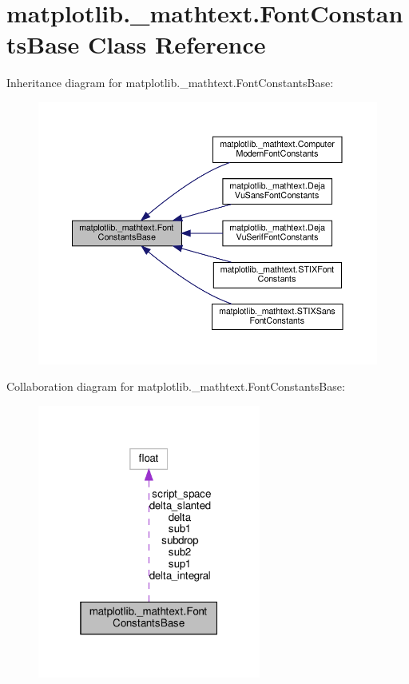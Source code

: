 \hypertarget{classmatplotlib_1_1__mathtext_1_1FontConstantsBase}{}\section{matplotlib.\+\_\+mathtext.\+Font\+Constants\+Base Class Reference}
\label{classmatplotlib_1_1__mathtext_1_1FontConstantsBase}


Inheritance diagram for matplotlib.\+\_\+mathtext.\+Font\+Constants\+Base\+:
\nopagebreak
\begin{figure}[H]
\begin{center}
\leavevmode
\includegraphics[width=350pt]{classmatplotlib_1_1__mathtext_1_1FontConstantsBase__inherit__graph}
\end{center}
\end{figure}


Collaboration diagram for matplotlib.\+\_\+mathtext.\+Font\+Constants\+Base\+:
\nopagebreak
\begin{figure}[H]
\begin{center}
\leavevmode
\includegraphics[width=208pt]{classmatplotlib_1_1__mathtext_1_1FontConstantsBase__coll__graph}
\end{center}
\end{figure}
